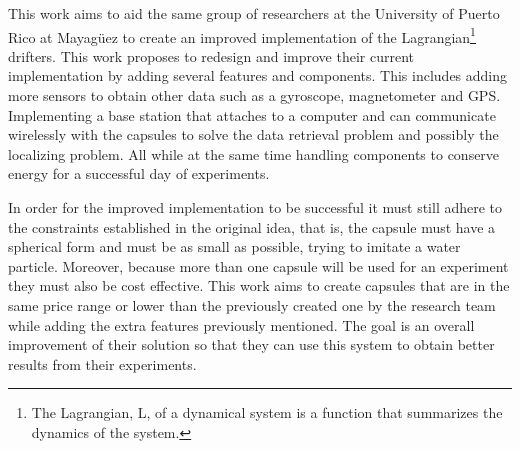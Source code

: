 This work aims to aid the same group of researchers at the University of Puerto Rico at Mayag\"uez to create an improved implementation of the Lagrangian\footnote{The Lagrangian, L, of a dynamical system is a function that summarizes the dynamics of the system.} drifters. This work proposes to redesign and improve their current implementation by adding several features and components.  This includes adding more sensors to obtain other data such as a gyroscope, magnetometer and GPS. Implementing a base station that attaches to a computer and can communicate wirelessly with the capsules to solve the data retrieval problem and possibly the localizing problem. All while at the same time handling components to conserve energy for a successful day of experiments.

In order for the improved implementation to be successful it must still adhere to the constraints established in the original idea, that is, the capsule must have a spherical form and must be as small as possible, trying to imitate a water particle. Moreover, because more than one capsule will be used for an experiment they must also be cost effective.  This work aims to create capsules that are in the same price range or lower than the previously created one by the research team while adding the extra features previously mentioned. The goal is an overall improvement of their solution so that they can use this system to obtain better results from their experiments.